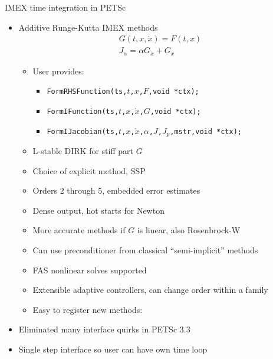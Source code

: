 \begin{frame}[shrink=5]{IMEX time integration in PETSc}
  \begin{itemize}
  \item Additive Runge-Kutta IMEX methods
    \begin{gather*}
      G(t,x,\dot x) = F(t,x) \\
      J_\alpha = \alpha G_{\dot x} + G_x
    \end{gather*}
    \begin{itemize}
    \item User provides:
      \begin{itemize}
      \item \texttt{FormRHSFunction(ts,$t$,$x$,$F$,void *ctx);}
      \item \texttt{FormIFunction(ts,$t$,$x$,$\dot x$,$G$,void *ctx);}
      \item \texttt{FormIJacobian(ts,$t$,$x$,$\dot x$,$\alpha$,$J$,$J_{p}$,mstr,void *ctx);}
      \end{itemize}
    \item L-stable DIRK for stiff part $G$
    \item Choice of explicit method, \eg SSP
    \item Orders 2 through 5, embedded error estimates
    \item Dense output, hot starts for Newton
    \item More accurate methods if $G$ is linear, also Rosenbrock-W
    \item Can use preconditioner from classical ``semi-implicit'' methods
    \item FAS nonlinear solves supported
    \item Extensible adaptive controllers, can change order within a family
    \item Easy to register new methods: 
    \end{itemize}
  \item Eliminated many interface quirks in PETSc 3.3
  \item Single step interface so user can have own time loop
  \end{itemize}
\end{frame}
